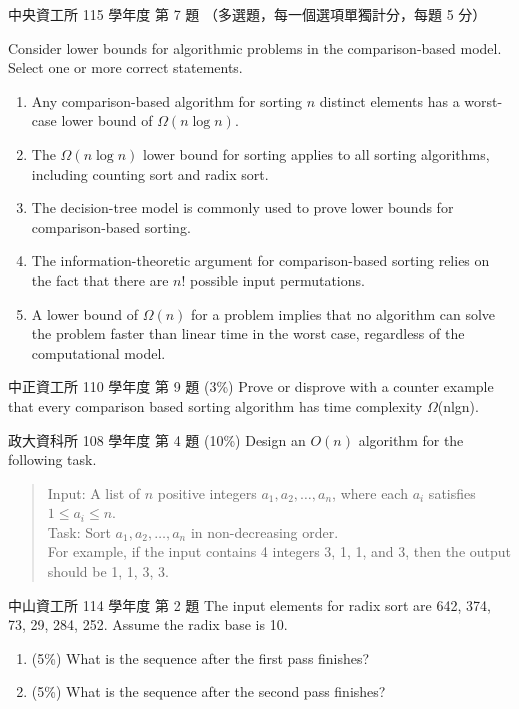 \begin{pastexam}[label={px:lin-1}]{中央資工所 115 學年度 第 7 題}
（多選題，每一個選項單獨計分，每題 5 分）

Consider lower bounds for algorithmic problems in the comparison-based model. Select one or more correct statements.
\begin{enumerate}[label=\Alph*.]
\item Any comparison-based algorithm for sorting $n$ distinct elements has a worst-case lower bound of $\Omega(n\log n)$.
\item The $\Omega(n\log n)$ lower bound for sorting applies to all sorting algorithms, including counting sort and radix sort.
\item The decision-tree model is commonly used to prove lower bounds for comparison-based sorting.
\item The information-theoretic argument for comparison-based sorting relies on the fact that there are $n!$ possible input permutations.
\item A lower bound of $\Omega(n)$ for a problem implies that no algorithm can solve the problem faster than linear time in the worst case, regardless of the computational model.
\end{enumerate}
\end{pastexam}

\begin{pastexam}[label={px:lin-2}]{中正資工所 110 學年度 第 9 題}
(3\%) Prove or disprove with a counter example that every comparison based sorting algorithm has time complexity $\Omega$(nlgn).
\end{pastexam}

\begin{pastexam}[label={px:lin-3}]{政大資科所 108 學年度 第 4 題}
(10\%) Design an $O(n)$ algorithm for the following task.

\begin{quote}
Input: A list of $n$ positive integers $a_1,a_2,\ldots,a_n$, where each $a_i$ satisfies $1\le a_i\le n$.\\
Task: Sort $a_1,a_2,\ldots,a_n$ in non-decreasing order.\\
For example, if the input contains 4 integers 3, 1, 1, and 3, then the output should be 1, 1, 3, 3.
\end{quote}
\end{pastexam}

\begin{pastexam}[label={px:lin-4}]{中山資工所 114 學年度 第 2 題}
The input elements for radix sort are 642, 374, 73, 29, 284, 252. Assume the radix base is 10.
\begin{enumerate}[label=(\alph*)]
\item (5\%) What is the sequence after the first pass finishes?
\item (5\%) What is the sequence after the second pass finishes?
\end{enumerate}
\end{pastexam}

